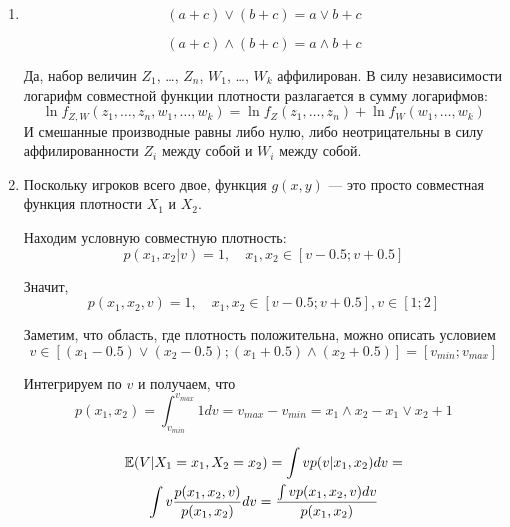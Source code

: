 \begin{enumerate}


\item
\begin{equation}
(a+c)\vee (b+c)=a\vee b +c
\end{equation}

\begin{equation}
(a+c)\wedge (b+c)=a\wedge b +c
\end{equation}

Да, набор величин $ Z_{1} $, \ldots , $ Z_{n} $, $ W_{1} $, \ldots , $ W_{k} $ аффилирован. В силу независимости логарифм совместной функции плотности разлагается в сумму логарифмов:
\begin{equation}
\ln f_{Z,W}(z_{1},\ldots ,z_{n},w_{1},\ldots ,w_{k})= \ln f_{Z}(z_{1},\ldots ,z_{n})+\ln f_{W}(w_{1},\ldots ,w_{k})
\end{equation}
И смешанные производные равны либо нулю, либо неотрицательны в силу аффилированности $ Z_{i} $ между собой и $ W_{i} $ между собой.

\item  Поскольку игроков всего двое, функция $ g(x,y)$ — это просто совместная функция плотности $ X_{1} $ и $ X_{2} $.

Находим условную совместную плотность:
\begin{equation}
p(x_{1},x_{2}|v)=1, \quad x_{1},x_{2}\in [v-0.5;v+0.5]
\end{equation}

Значит,
\begin{equation}
p(x_{1},x_{2},v)=1, \quad x_{1},x_{2}\in [v-0.5;v+0.5],v\in [1;2]
\end{equation}

Заметим, что область, где плотность положительна, можно описать условием
\begin{equation}
v\in [(x_{1}-0.5)\vee (x_{2}-0.5); (x_{1}+0.5)\wedge (x_{2}+0.5)]=[v_{min};v_{max}]
\end{equation}

Интегрируем по $ v $ и получаем, что
\begin{equation}
p(x_{1},x_{2})=\int_{v_{min}}^{v_{max}} 1 dv= v_{max}-v_{min}=x_{1}\wedge x_{2}-x_{1}\vee x_{2}+1
\end{equation}

\begin{multline}
\operatorname{\mathbb{E}}(V|X_{1}=x_{1}, X_{2}=x_{2})=\int v p(v|x_{1},x_{2})dv=\\
\int v \frac{p(x_{1},x_{2},v)}{p(x_{1},x_{2})} dv=\frac{\int v p(x_{1},x_{2},v) dv }{p(x_{1},x_{2})}
\end{multline}


\end{enumerate}

